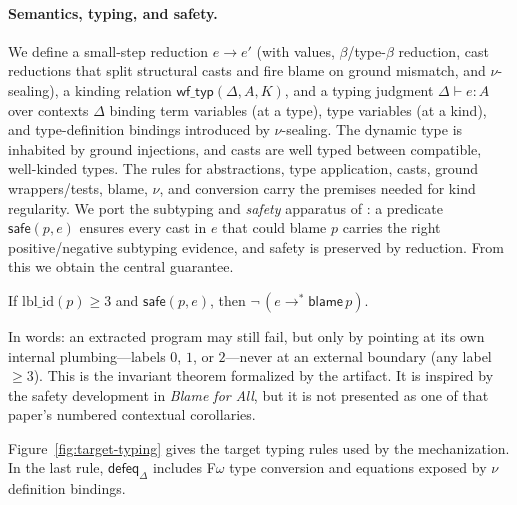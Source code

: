 \documentclass[acmsmall,anonymous=false,nonacm]{acmart}
\newcommand{\blame}[1]{\mathsf{blame}\,#1}
\newcommand{\reduces}{\longrightarrow}
\newcommand{\reducesstar}{\longrightarrow^{*}}
\newcommand{\hastype}[3]{#1 \vdash #2 : #3}
\begin{document}
\paragraph{Semantics, typing, and safety.}
We define a small-step reduction $e \reduces e'$ (with values, $\beta$/type-$\beta$
reduction, cast reductions that split structural casts and fire blame on ground
mismatch, and $\nu$-sealing), a kinding relation
$\mathsf{wf\_typ}(\Delta, A, K)$, and a typing judgment
$\hastype{\Delta}{e}{A}$ over contexts $\Delta$ binding term variables (at a
type), type variables (at a kind), and type-definition bindings introduced by
$\nu$-sealing. The dynamic type is inhabited by ground
injections, and casts are well typed between compatible, well-kinded types. The
rules for abstractions, type application, casts, ground wrappers/tests, blame,
$\nu$, and conversion carry the premises needed for kind regularity. We
port the subtyping and \emph{safety} apparatus of \cite{ahmed2011blame}: a
predicate $\mathsf{safe}(p, e)$ ensures every cast in $e$ that could blame $p$
carries the right positive/negative subtyping evidence, and safety is preserved
by reduction. From this we obtain the central guarantee.

\begin{theorem}
\label{thm:blame}
If $\mathrm{lbl\_id}(p) \ge 3$ and $\mathsf{safe}(p, e)$, then
$\neg\,(e \reducesstar \blame p)$.
\end{theorem}
In words: an extracted program may still fail, but only by pointing at its own
internal plumbing---labels $0$, $1$, or $2$---never at an external boundary
(any label $\ge 3$). This is the invariant theorem formalized by the artifact.
It is inspired by the safety development in \emph{Blame for All}, but it is not
presented as one of that paper's numbered contextual corollaries.

Figure~\ref{fig:target-typing} gives the target typing rules used by the
mechanization.  In the last rule, $\mathsf{defeq}_{\Delta}$ includes
F$\omega$ type conversion and equations exposed by $\nu$ definition bindings.
\end{document}
